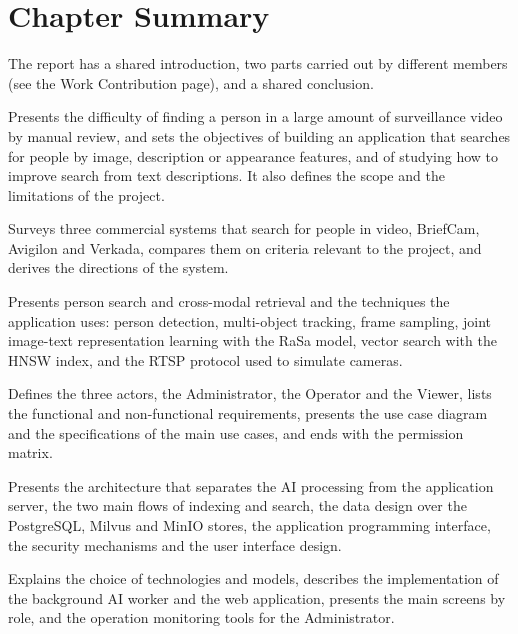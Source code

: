 \chapter*{Chapter Summary}

The report has a shared introduction, two parts carried out by different members (see the Work Contribution page), and a shared conclusion.

\begin{description}[style=nextline]
    \item[Chapter 1: Introduction] Presents the difficulty of finding a person in a large amount of surveillance video by manual review, and sets the objectives of building an application that searches for people by image, description or appearance features, and of studying how to improve search from text descriptions. It also defines the scope and the limitations of the project.
    \item[Part I: The Person Search Application] \mbox{}
    \item[Chapter 2: Related Systems] Surveys three commercial systems that search for people in video, BriefCam, Avigilon and Verkada, compares them on criteria relevant to the project, and derives the directions of the system.
    \item[Chapter 3: Theoretical Background] Presents person search and cross-modal retrieval and the techniques the application uses: person detection, multi-object tracking, frame sampling, joint image-text representation learning with the RaSa model, vector search with the HNSW index, and the RTSP protocol used to simulate cameras.
    \item[Chapter 4: System Analysis] Defines the three actors, the Administrator, the Operator and the Viewer, lists the functional and non-functional requirements, presents the use case diagram and the specifications of the main use cases, and ends with the permission matrix.
    \item[Chapter 5: System Design] Presents the architecture that separates the AI processing from the application server, the two main flows of indexing and search, the data design over the PostgreSQL, Milvus and MinIO stores, the application programming interface, the security mechanisms and the user interface design.
    \item[Chapter 6: System Implementation] Explains the choice of technologies and models, describes the implementation of the background AI worker and the web application, presents the main screens by role, and the operation monitoring tools for the Administrator.

\end{description}
